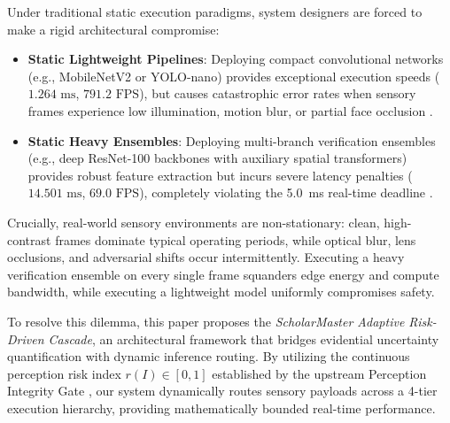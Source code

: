 \documentclass[10pt,journal,compsoc]{IEEEtran}
\begin{document}
Under traditional static execution paradigms, system designers are forced to make a rigid architectural compromise:
\begin{itemize}
    \item \textbf{Static Lightweight Pipelines}: Deploying compact convolutional networks (e.g., MobileNetV2 or YOLO-nano) provides exceptional execution speeds ($1.264\text{ ms}$, $791.2\text{ FPS}$), but causes catastrophic error rates when sensory frames experience low illumination, motion blur, or partial face occlusion \cite{sandler2018mobilenetv2}.
    \item \textbf{Static Heavy Ensembles}: Deploying multi-branch verification ensembles (e.g., deep ResNet-100 backbones with auxiliary spatial transformers) provides robust feature extraction but incurs severe latency penalties ($14.501\text{ ms}$, $69.0\text{ FPS}$), completely violating the 5.0~ms real-time deadline \cite{deng2019arcface, he2016deep}.
\end{itemize}

Crucially, real-world sensory environments are non-stationary: clean, high-contrast frames dominate typical operating periods, while optical blur, lens occlusions, and adversarial shifts occur intermittently. Executing a heavy verification ensemble on every single frame squanders edge energy and compute bandwidth, while executing a lightweight model uniformly compromises safety.

To resolve this dilemma, this paper proposes the \textit{ScholarMaster Adaptive Risk-Driven Cascade}, an architectural framework that bridges evidential uncertainty quantification with dynamic inference routing. By utilizing the continuous perception risk index $r(I) \in [0, 1]$ established by the upstream Perception Integrity Gate \cite{kumar2026scholar22}, our system dynamically routes sensory payloads across a 4-tier execution hierarchy, providing mathematically bounded real-time performance.
\end{document}
